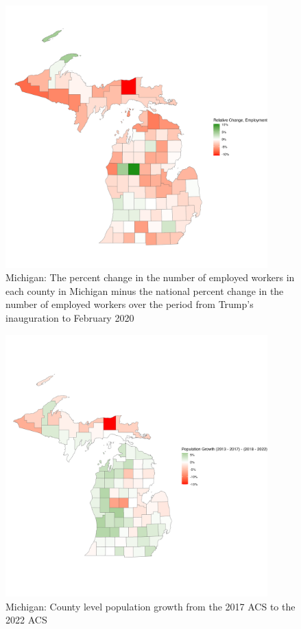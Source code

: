 \documentclass[11pt]{article}
\begin{document}
\begin{figure}
    \centering
    \includegraphics[width=0.9\textwidth]{plots/relative-employment-plot.png}
    \caption{Michigan: The percent change in the number of employed workers in each county in Michigan minus the national percent change in the number of employed workers over the period from Trump's inauguration to February 2020}
\end{figure}
\begin{figure}
    \centering
    \includegraphics[width=0.9\textwidth]{plots/mi-growth.png}
    \caption{Michigan: County level population growth from the 2017 ACS to the 2022 ACS}
\end{figure}
\end{document}
